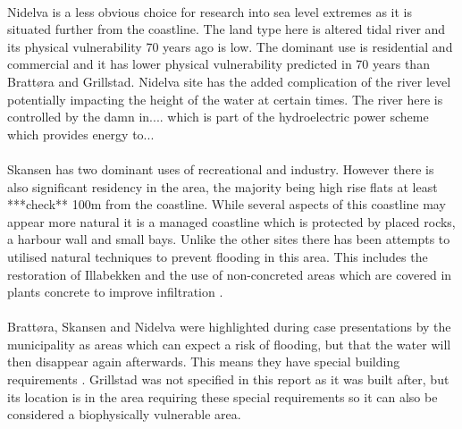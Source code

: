 \paragraph{}
Nidelva is a less obvious choice for research into sea level extremes as it is situated further from the coastline. The land type here is altered tidal river and its physical vulnerability 70 years ago is low. The dominant use is residential and commercial and it has lower physical vulnerability predicted in 70 years than Brattøra and Grillstad. Nidelva site has the added complication of the river level potentially impacting the height of the water at certain times. The river here is controlled by the damn in.... which is part of the hydroelectric power scheme which provides energy to...
\paragraph{}
Skansen has two dominant uses of recreational and industry. However there is also significant residency in the area, the majority being high rise flats at least ***check** 100m from the coastline. While several aspects of this coastline may appear more natural it is a managed coastline which is protected by placed rocks, a harbour wall and small bays. Unlike the other sites there has been attempts to utilised natural techniques to prevent flooding in this area. This includes the restoration of Illabekken and the use of non-concreted areas which are covered in plants concrete to improve infiltration \cite{selliseth_ilabekken_2021}.
\paragraph{}

\paragraph{}
Brattøra, Skansen and Nidelva were highlighted during case presentations by the municipality as areas which can expect a risk of flooding, but that the water will then disappear again afterwards. This means they have special building requirements \cite{hanssen_saksframlegg_2013}. Grillstad was not specified in this report as it was built after, but its location is in the area requiring these special requirements so it can also be considered a biophysically vulnerable area.  


